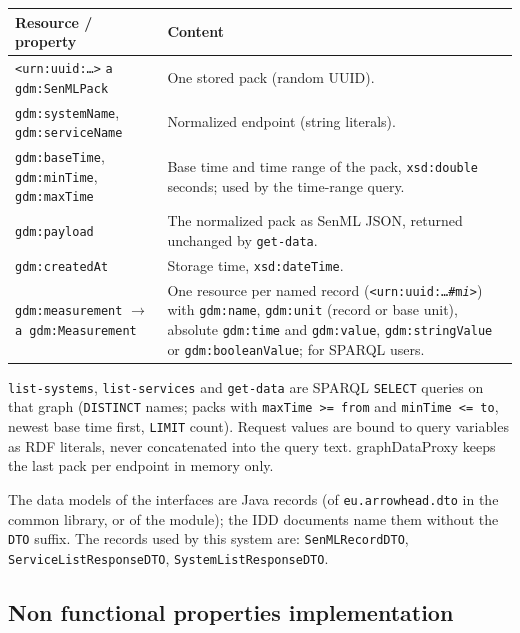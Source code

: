 \documentclass[a4paper]{arrowhead}
\begin{document}
\noindent\begin{longtable}{| p{5.0cm} | p{10.2cm} |} \hline
\rowcolor{gray!33} Resource / property & Content \\ \hline \endhead
\texttt{<urn:uuid:\ldots>} \texttt{a gdm:SenMLPack} & One stored pack (random UUID). \\ \hline
\texttt{gdm:systemName}, \texttt{gdm:serviceName} & Normalized endpoint (string literals). \\ \hline
\texttt{gdm:baseTime}, \texttt{gdm:minTime}, \texttt{gdm:maxTime} & Base time and time range of the pack, \texttt{xsd:double} seconds; used by the time-range query. \\ \hline
\texttt{gdm:payload} & The normalized pack as SenML JSON, returned unchanged by \texttt{get-\allowbreak{}data}. \\ \hline
\texttt{gdm:createdAt} & Storage time, \texttt{xsd:dateTime}. \\ \hline
\texttt{gdm:measurement} $\rightarrow$ \texttt{a gdm:Measurement} & One resource per named record (\texttt{<urn:uuid:\ldots\#m\textit{i}>}) with \texttt{gdm:name}, \texttt{gdm:unit} (record or base unit), absolute \texttt{gdm:time} and \texttt{gdm:value}, \texttt{gdm:stringValue} or \texttt{gdm:booleanValue}; for SPARQL users. \\ \hline
\end{longtable}

\texttt{list-\allowbreak{}systems}, \texttt{list-\allowbreak{}services} and \texttt{get-\allowbreak{}data} are SPARQL \texttt{SELECT} queries \cite{sparql11} on that graph (\texttt{DISTINCT} names; packs with \texttt{maxTime >= from} and \texttt{minTime <= to}, newest base time first, \texttt{LIMIT} count). Request values are bound to query variables as RDF literals, never concatenated into the query text. graphDataProxy keeps the last pack per endpoint in memory only.

The data models of the interfaces are Java records (of \texttt{eu.arrowhead.dto} in the common library, or of the module); the IDD documents name them without the \texttt{DTO} suffix. The records used by this system are: \texttt{SenMLRecordDTO}, \texttt{Service\allowbreak{}List\allowbreak{}Response\allowbreak{}DTO}, \texttt{System\allowbreak{}List\allowbreak{}Response\allowbreak{}DTO}.

\subsection{Non functional properties implementation}
\end{document}
